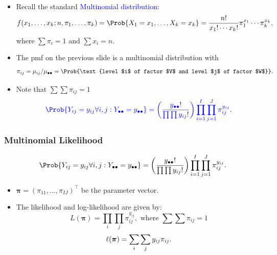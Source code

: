 \documentclass[oneside]{book}\usepackage[]{graphicx}\usepackage[svgnames]{xcolor}
\providecommand\given{} %
\renewcommand\given{\nonscript\:\delimsize\vert\nonscript\:\mathopen{}}%
\renewcommand\given{\nonscript\:\delimsize\vert\nonscript\:\mathopen{}}%
\renewcommand\given{\nonscript\:\delimsize\vert\nonscript\:\mathopen{}}%
\renewcommand\given{\nonscript\:\delimsize\vert\nonscript\:\mathopen{}}%
\renewcommand\given{\nonscript\:\delimsize\vert\nonscript\:\mathopen{}}%
\renewcommand\given{\nonscript\:\delimsize\vert\nonscript\:\mathopen{}}%
\renewcommand\given{\nonscript\:\delimsize\vert\nonscript\:\mathopen{}}%
\renewcommand\given{\nonscript\:\delimsize\vert\nonscript\:\mathopen{}}%
\renewcommand\given{\nonscript\:\delimsize\vert\nonscript\:\mathopen{}}%
\renewcommand\given{\nonscript\:\delimsize\vert\nonscript\:\mathopen{}}%
\renewcommand\given{\nonscript\:\delimsize\vert\nonscript\:\mathopen{}}%
\renewcommand\given{\nonscript\:\delimsize\vert\nonscript\:\mathopen{}}%
\let\log\relax%
\renewcommand\given{:}
\providecommand{\Vector}[1]{\bm{#1}}%
\begin{document}
\begin{itemize}
\begin{align*}
            \end{align*}
      \item Recall the standard \textcolor{Blue}{Multinomial distribution}:
            \[ f(x_1,\ldots,x_k;n,\pi_1,\ldots,\pi_k)=\Prob{X_1=x_1,\ldots,X_k=x_k}=\frac{n!}{x_1!\cdots x_k!}\pi_1^{x_1}\cdots \pi_k^{x_k}, \]
            where $ \sum \pi_i=1 $ and $ \sum x_i=n $.
      \item The pmf on the previous slide is a multinomial distribution with
            \[ \pi_{ij}=\mu_{ij}/\mu_{\bullet\bullet}=\Prob{\text{level $i$ of factor $V$ and level $j$ of factor $W$}}. \]
      \item Note that $\sum\sum \pi_{ij}=1$
            \[ \textcolor{Blue}{\Prob{Y_{ij}=y_{ij}\forall i,j\given Y_{\bullet\bullet}=y_{\bullet\bullet}}
                  =\biggl(\frac{y_{\bullet\bullet}!}{\prod\prod y_{ij}!}\biggr)\prod_{i=1}^I \prod_{j=1}^J \pi_{ij}^{y_{ij}}}. \]
\end{itemize}
\subsubsection*{Multinomial Likelihood}
\[ \Prob{Y_{ij}=y_{ij}\forall i,j\given Y_{\bullet\bullet}=y_{\bullet\bullet}}
      =\biggl(\frac{y_{\bullet\bullet}!}{\prod\prod y_{ij}!}\biggr)\prod_{i=1}^I \prod_{j=1}^J \pi_{ij}^{y_{ij}}. \]
\begin{itemize}
      \item $ \Vector{\pi}=(\pi_{11},\ldots,\pi_{IJ})^\top $ be the parameter vector.
      \item The likelihood and log-likelihood are given by:
            \[ L(\Vector{\pi})=\prod_i\prod_j \pi_{ij}^{y_{ij}},\text{ where }\sum\sum \pi_{ij}=1 \]
            \[ \ell(\Vector{\pi})=\sum_i\sum_j y_{ij}\log{\pi_{ij}}. \]
\end{itemize}
\end{document}
